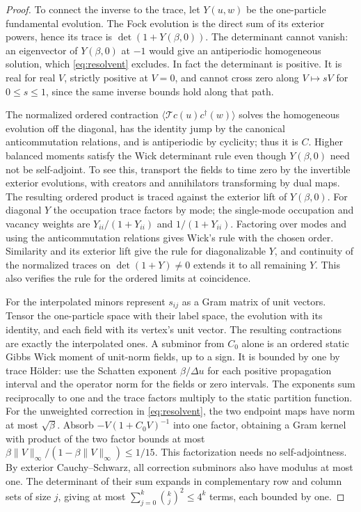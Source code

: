 \documentclass[11pt]{article}
\begin{document}
\begin{proof}
To connect the inverse to the trace, let $Y(u,w)$ be the one-particle fundamental evolution. The Fock evolution is the direct sum of its exterior powers, hence its trace is $\det(1+Y(\beta,0))$. The determinant cannot vanish: an eigenvector of $Y(\beta,0)$ at $-1$ would give an antiperiodic homogeneous solution, which \eqref{eq:resolvent} excludes. In fact the determinant is positive. It is real for real $V$, strictly positive at $V=0$, and cannot cross zero along $V\mapsto sV$ for $0\le s\le1$, since the same inverse bounds hold along that path.

The normalized ordered contraction $\langle\mathcal T c(u)c^\dagger(w)\rangle$ solves the homogeneous evolution off the diagonal, has the identity jump by the canonical anticommutation relations, and is antiperiodic by cyclicity; thus it is $C$. Higher balanced moments satisfy the Wick determinant rule even though $Y(\beta,0)$ need not be self-adjoint. To see this, transport the fields to time zero by the invertible exterior evolutions, with creators and annihilators transforming by dual maps. The resulting ordered product is traced against the exterior lift of $Y(\beta,0)$. For diagonal $Y$ the occupation trace factors by mode; the single-mode occupation and vacancy weights are $Y_{ii}/(1+Y_{ii})$ and $1/(1+Y_{ii})$. Factoring over modes and using the anticommutation relations gives Wick's rule with the chosen order. Similarity and its exterior lift give the rule for diagonalizable $Y$, and continuity of the normalized traces on $\det(1+Y)\ne 0$ extends it to all remaining $Y$. This also verifies the rule for the ordered limits at coincidence.

For the interpolated minors represent $s_{ij}$ as a Gram matrix of unit vectors. Tensor the one-particle space with their label space, the evolution with its identity, and each field with its vertex's unit vector. The resulting contractions are exactly the interpolated ones. A subminor from $C_0$ alone is an ordered static Gibbs Wick moment of unit-norm fields, up to a sign. It is bounded by one by trace H\"older: use the Schatten exponent $\beta/\Delta u$ for each positive propagation interval and the operator norm for the fields or zero intervals. The exponents sum reciprocally to one and the trace factors multiply to the static partition function. For the unweighted correction in \eqref{eq:resolvent}, the two endpoint maps have norm at most $\sqrt\beta$. Absorb $-V(1+C_0V)^{-1}$ into one factor, obtaining a Gram kernel with product of the two factor bounds at most $\beta\|V\|_\infty/(1-\beta\|V\|_\infty)\le 1/15$. This factorization needs no self-adjointness. By exterior Cauchy--Schwarz, all correction subminors also have modulus at most one. The determinant of their sum expands in complementary row and column sets of size $j$, giving at most $\sum_{j=0}^k\binom{k}{j}^2\le 4^k$ terms, each bounded by one.
\end{proof}
\end{document}
